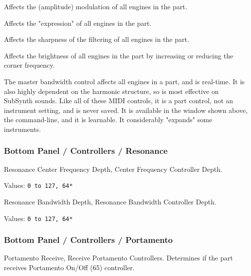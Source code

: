    Affects the (amplitude) modulation of all engines in the part.

   Affects the "expression" of all engines in the part.

   Affects the sharpness of the filtering of all engines in the part.

   Affects the brightness of all engines in the part by increasing or reducing
   the corner frequency.

   The master bandwidth control affects all engines in a part, and is
   real-time. It is also highly dependent on the harmonic structure, so is most
   effective on SubSynth sounds.  Like all of these MIDI controls, it is a part
   control, not an instrument setting, and is never saved.
   It is available in the window shown above, the command-line,
   and it is learnable.
   It considerably "expands" some instruments.

\subsubsection{Bottom Panel / Controllers / Resonance}
\label{subsubsec:bottom_panel_controllers_resonance}

   \setcounter{ItemCounter}{0}      %

   Resonance Center Frequency Depth,
   Center Frequency Controller Depth.

   Values: \texttt{0 to 127, 64*}

   Resonance Bandwidth Depth,
   Resonance Bandwidth Controller Depth.

   Values: \texttt{0 to 127, 64*}

\subsubsection{Bottom Panel / Controllers / Portamento}
\label{subsubsec:bottom_panel_controllers_portamento}

   \setcounter{ItemCounter}{0}      %

   Portamento Receive,
   Receive Portamento Controllers.
   Determines if the part receives Portamento On/Off (65) controller.

